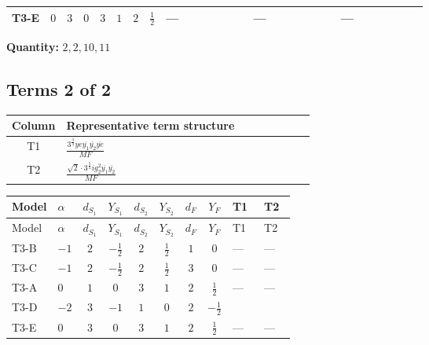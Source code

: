 \documentclass[8pt]{article}
\begin{document}
\begin{landscape}
\begin{longtable}{@{}llcccccc >{\raggedright\arraybackslash}p{0.21\linewidth} >{\raggedright\arraybackslash}p{0.21\linewidth} >{\raggedright\arraybackslash}p{0.21\linewidth}@{}}
\midrule
T3-E & $0$ & $3$ & $0$ & $3$ & $1$ & $2$ & $\frac{1}{2}$ & --- & --- & --- \\
\midrule
\bottomrule
\end{longtable}
\clearpage
\noindent\textbf{Quantity: }$\mathrm{2,2,10,11}$\par\smallskip
\subsection*{Terms 2 of 2}
\begin{center}
\begin{tabular}{@{}c >{\raggedright\arraybackslash}p{0.82\linewidth}@{}}
\toprule
Column & Representative term structure \\
\midrule
T1 & \(\displaystyle \frac{3^{\frac{3}{4}} ye \overline{y_{1}} \overline{y_{2}} \overline{ye}}{MF}\) \\
\midrule
T2 & \(\displaystyle \frac{\sqrt{2} \cdot 3^{\frac{3}{4}} i g_{2}^{2} \overline{y_{1}} \overline{y_{2}}}{MF}\) \\
\midrule
\bottomrule
\end{tabular}
\end{center}
\smallskip
\tiny
\begin{longtable}{@{}llcccccc >{\raggedright\arraybackslash}p{0.21\linewidth} >{\raggedright\arraybackslash}p{0.21\linewidth}@{}}
\toprule
Model & $\alpha$ & $d_{S_1}$ & $Y_{S_1}$ & $d_{S_2}$ & $Y_{S_2}$ & $d_F$ & $Y_F$ & T1 & T2 \\
\midrule
\endfirsthead
\toprule
Model & $\alpha$ & $d_{S_1}$ & $Y_{S_1}$ & $d_{S_2}$ & $Y_{S_2}$ & $d_F$ & $Y_F$ & T1 & T2 \\
\midrule
\endhead
T3-B & $-1$ & $2$ & $-\frac{1}{2}$ & $2$ & $\frac{1}{2}$ & $1$ & $0$ & --- & --- \\
\midrule
T3-C & $-1$ & $2$ & $-\frac{1}{2}$ & $2$ & $\frac{1}{2}$ & $3$ & $0$ & --- & --- \\
\midrule
T3-A & $0$ & $1$ & $0$ & $3$ & $1$ & $2$ & $\frac{1}{2}$ & --- & --- \\
\midrule
T3-D & $-2$ & $3$ & $-1$ & $1$ & $0$ & $2$ & $-\frac{1}{2}$ & \scriptsize\adjustbox{max width=\linewidth}{$\begin{gathered} \frac{3^{\frac{3}{4}} ye \overline{y_{1}} \overline{y_{2}} \overline{ye}}{12 MF}\end{gathered}$} & \scriptsize\adjustbox{max width=\linewidth}{$\begin{gathered} \frac{\sqrt{2} \cdot 3^{\frac{3}{4}} i g_{2}^{2} \overline{y_{1}} \overline{y_{2}}}{3 MF}\end{gathered}$} \\
\midrule
T3-E & $0$ & $3$ & $0$ & $3$ & $1$ & $2$ & $\frac{1}{2}$ & --- & --- \\
\midrule
\bottomrule
\end{longtable}
\clearpage

\end{landscape}
\end{document}
